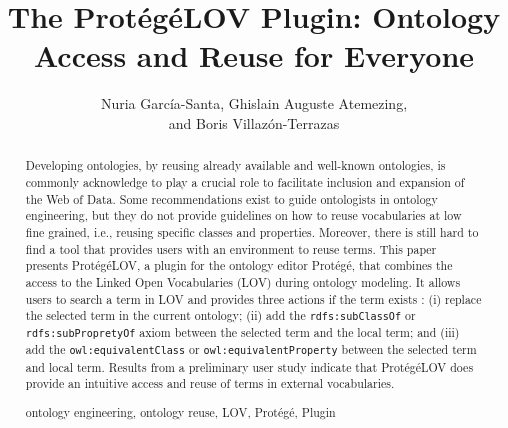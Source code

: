 \documentclass[runningheads,a4paper]{llncs}
\newcommand{\keywords}[1]{\par\addvspace\baselineskip
\noindent\keywordname\enspace\ignorespaces#1}
\begin{document}

\title{The Prot{\'e}g{\'e}LOV Plugin: Ontology Access and Reuse for Everyone }


\author{ Nuria Garc\'ia-Santa, Ghislain Auguste Atemezing,\\ and Boris Villaz{\'o}n-Terrazas}


\maketitle


\begin{abstract}
Developing ontologies, by reusing already available and well-known ontologies, is commonly acknowledge to play a crucial role to facilitate inclusion and expansion of the Web of Data. Some recommendations exist to guide ontologists in ontology engineering, but they do not provide guidelines on how to reuse vocabularies at low fine grained, i.e., reusing specific classes and properties. Moreover, there is still hard to find a tool that provides users with an environment to reuse terms. This paper presents Prot{\'e}g{\'e}LOV, a plugin for the ontology editor Prot{\'e}g{\'e}, that combines the access to the Linked Open Vocabularies (LOV) during ontology modeling. It allows users to search a term in LOV and provides three actions if the term exists : (i) replace the selected term in the current ontology; (ii) add the {\tt rdfs:subClassOf} or {\tt rdfs:subPropretyOf} axiom between the selected term and the local term; and (iii) add the {\tt owl:equivalentClass} or {\tt owl:equivalentProperty} between the selected term and local term. Results from a preliminary user study indicate that Prot{\'e}g{\'e}LOV does provide an intuitive access and reuse of terms in external vocabularies.
\keywords{ontology engineering, ontology reuse, LOV, Prot{\'e}g{\'e}, Plugin} 
\end{abstract}

\end{document}
